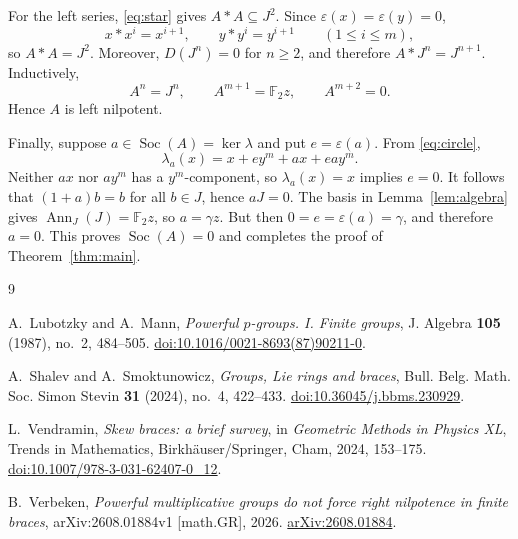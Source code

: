 \documentclass[11pt]{amsart}
\newcommand{\F}{\mathbb{F}}
\newcommand{\Soc}{\operatorname{Soc}}
\begin{document}
For the left series, \eqref{eq:star} gives $A*A\subseteq J^2$. Since
$\varepsilon(x)=\varepsilon(y)=0$,
\[
 x*x^i=x^{i+1},
 \qquad
 y*y^i=y^{i+1}
 \qquad(1\leq i\leq m),
\]
so $A*A=J^2$. Moreover, $D(J^n)=0$ for $n\geq2$, and therefore
$A*J^n=J^{n+1}$. Inductively,
\[
 A^n=J^n,
 \qquad
 A^{m+1}=\F_2z,
 \qquad
 A^{m+2}=0.
\]
Hence $A$ is left nilpotent.

Finally, suppose $a\in\Soc(A)=\ker\lambda$ and put
$e=\varepsilon(a)$. From \eqref{eq:circle},
\[
 \lambda_a(x)=x+e y^m+ax+eay^m.
\]
Neither $ax$ nor $ay^m$ has a $y^m$-component, so
$\lambda_a(x)=x$ implies $e=0$. It follows that
$(1+a)b=b$ for all $b\in J$, hence $aJ=0$. The basis in
Lemma~\ref{lem:algebra} gives
$\operatorname{Ann}_J(J)=\F_2z$, so $a=\gamma z$. But then
$0=e=\varepsilon(a)=\gamma$, and therefore $a=0$. This proves
$\Soc(A)=0$ and completes the proof of Theorem~\ref{thm:main}.

\begin{thebibliography}{9}

A.~Lubotzky and A.~Mann,
\emph{Powerful $p$-groups. I. Finite groups},
J. Algebra \textbf{105} (1987), no.~2, 484--505.
\href{https://doi.org/10.1016/0021-8693(87)90211-0}
{doi:10.1016/0021-8693(87)90211-0}.

A.~Shalev and A.~Smoktunowicz,
\emph{Groups, Lie rings and braces},
Bull. Belg. Math. Soc. Simon Stevin \textbf{31} (2024), no.~4, 422--433.
\href{https://doi.org/10.36045/j.bbms.230929}
{doi:10.36045/j.bbms.230929}.

L.~Vendramin,
\emph{Skew braces: a brief survey},
in \emph{Geometric Methods in Physics XL}, Trends in Mathematics,
Birkh\"auser/Springer, Cham, 2024, 153--175.
\href{https://doi.org/10.1007/978-3-031-62407-0_12}
{doi:10.1007/978-3-031-62407-0\_12}.

B.~Verbeken,
\emph{Powerful multiplicative groups do not force right nilpotence in finite braces},
arXiv:2608.01884v1 [math.GR], 2026.
\href{https://arxiv.org/abs/2608.01884}{arXiv:2608.01884}.

\end{thebibliography}
\end{document}
